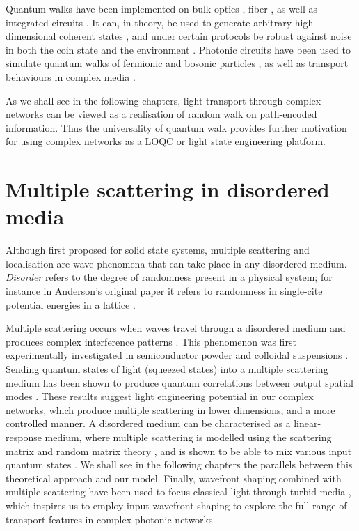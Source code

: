 Quantum walks have been implemented on bulk optics \cite{Broome2010}, fiber \cite{Defienne2016}, as well as integrated circuits \cite{Harris2017}. It can, in theory, be used to generate arbitrary high-dimensional coherent states \cite{Innocenti2017}, and under certain protocols be robust against noise in both the coin state and the environment \cite{Majury2016}. Photonic circuits have been used to simulate quantum walks of fermionic and bosonic particles \cite{Sansoni2012}, as well as transport behaviours in complex media \cite{Harris2017}.

As we shall see in the following chapters, light transport through complex networks can be viewed as a realisation of random walk on path-encoded information. Thus the universality of quantum walk provides further motivation for using complex networks as a LOQC or light state engineering platform.

\section{Multiple scattering in disordered media}
Although first proposed for solid state systems, multiple scattering and localisation are wave phenomena that can take place in any disordered medium. \textit{Disorder} refers to the degree of randomness present in a physical system; for instance in Anderson's original paper it refers to randomness in single-cite potential energies in a lattice \cite{Anderson1958}. 

Multiple scattering occurs when waves travel through a disordered medium and produces complex interference patterns \cite{Ott2012}. This phenomenon was first experimentally investigated in semiconductor powder \cite{Wiersma1997} and colloidal suspensions \cite{Lawandy1994}. Sending quantum states of light (squeezed states) into a multiple scattering medium has been shown to produce quantum correlations between output spatial modes \cite{Smolka2009,Smolka2012}. These results suggest light engineering potential in our complex networks, which produce multiple scattering in lower dimensions, and a more controlled manner. A disordered medium can be characterised as a linear-response medium, where multiple scattering is modelled using the scattering matrix and random matrix theory \cite{Rotter2017}, and is shown to be able to mix various input quantum states \cite{Ott2010}. We shall see in the following chapters the parallels between this theoretical approach and our model. Finally, wavefront shaping combined with multiple scattering have been used to focus classical light through turbid media \cite{Katz2011}, which inspires us to employ input wavefront shaping to explore the full range of transport features in complex photonic networks. 

